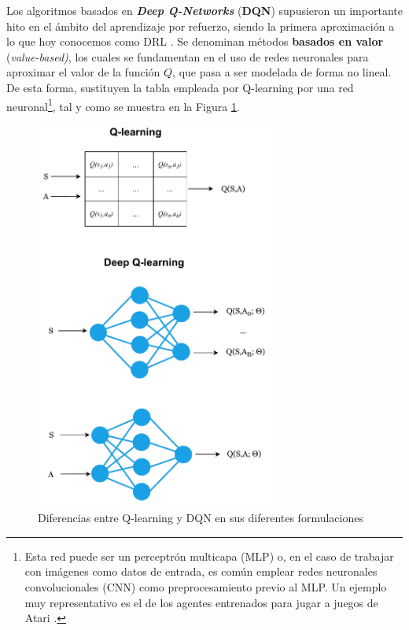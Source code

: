Los algoritmos basados en \textbf{\textit{Deep Q-Networks}} (\textbf{DQN}) supusieron un importante hito en el ámbito del aprendizaje por refuerzo, siendo la primera aproximación a lo que hoy conocemos como DRL \cite{mnih2013playing, mnih2015human}. Se denominan métodos \textbf{basados en valor} (\textit{value-based)}, los cuales se fundamentan en el uso de redes neuronales para aproximar el valor de la función $Q$, que pasa a ser modelada de forma no lineal. De esta forma, sustituyen la tabla empleada por Q-learning por una red neuronal\footnote{Esta red puede ser un perceptrón multicapa (MLP) o, en el caso de trabajar con imágenes como datos de entrada, es común emplear redes neuronales convolucionales (CNN) como preprocesamiento previo al MLP. Un ejemplo muy representativo es el de los agentes entrenados para jugar a juegos de Atari \cite{mnih2013playing}.}, tal y como se muestra en la Figura \ref{fig:dqn}.

\begin{figure}
    \centering
    \includegraphics[width=0.7\textwidth]{imagenes/DQN.pdf}
    \caption{Diferencias entre Q-learning y DQN en sus diferentes formulaciones}
    \label{fig:dqn}
\end{figure}

